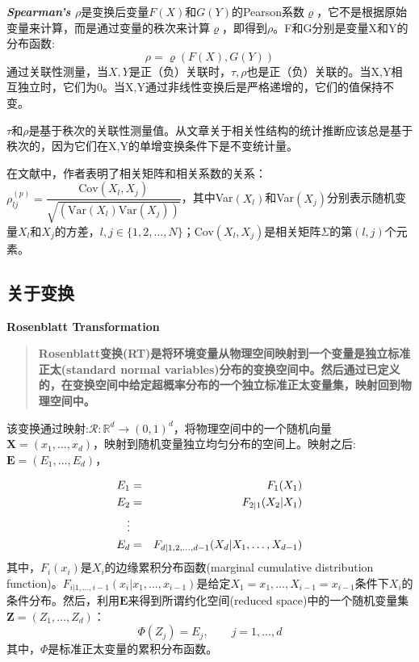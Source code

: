 \emph{\textbf{\textcolor[rgb]{1,0,0}{Spearman's $\rho$}}}是变换后变量$F(X)$和$G(Y)$的Pearson系数$\varrho$\cite{Montes2015}，它不是根据原始变量来计算，而是通过变量的秩次来计算$\varrho$，即得到$\rho$。F和G分别是变量X和Y的分布函数:
\begin{equation}
    \label{eq-rho}
    \rho = \varrho(F(X),G(Y))
\end{equation}
通过关联性测量，当$X,Y$是正（负）关联时，$\tau,\rho$也是正（负）关联的。当X,Y相互独立时，它们为0。当X,Y通过非线性变换后是严格递增的，它们的值保持不变。

\textcolor[rgb]{1,0,0}{$\tau$和$\rho$是基于秩次的关联性测量值。从文章\cite{Genest2007}关于相关性结构的统计推断应该总是基于秩次的，因为它们在X,Y的单增变换条件下是不变统计量。}


在文献\cite{Deligiannis2012}中，作者表明了相关矩阵和相关系数的关系：$\rho_{lj}^{(p)} = \dfrac{\text{Cov}(X_l,X_j)}{\sqrt{\left(\text{Var}(X_l)\text{Var}(X_j)\right)}}$，其中Var$(X_l)$和Var$(X_j)$分别表示随机变量$X_l$和$X_j$的方差，$l,j \in \{1,2,\dots,N\}$；Cov$(X_l,X_j)$是相关矩阵$\Sigma$的第$(l,j)$个元素。



\subsection{关于变换}
\textbf{\textcolor[rgb]{1,0,0}{Rosenblatt Transformation}}
\begin{quotation}
    \textbf{\textcolor[rgb]{1,0,0}{Rosenblatt变换(RT)是将环境变量从物理空间映射到一个变量是独立标准正太(standard normal variables)分布的变换空间中。然后通过已定义的，在变换空间中给定超概率分布的一个独立标准正太变量集，映射回到物理空间中。}}\cite{Montes2015}
\end{quotation}


该变换通过映射:$\mathcal{R}: \mathbb{R}^d \rightarrow (0,1)^d$，将物理空间中的一个随机向量$\mathbf{X}=(x_1,\dots,x_d)$，映射到随机变量独立均匀分布的空间上。映射之后:$\mathbf{E} = (E_1,\dots,E_d)$\cite{Montes2015}，

\begin{eqnarray}
    E_1 &=& F_1(X_1)  \notag \\
    E_2 &=& F_{2|1}(X_2|X_1) \notag \\
    \vdots \\
    E_d &=& F_{d|1,2,\dots,d-1} (X_d | X_1,\dots,X_{d-1}) \notag
    \label{eq-rosenblatt}
\end{eqnarray}
其中，$F_i(x_i)$是$X_i$的\textcolor[rgb]{1,0,0}{边缘累积分布函数(marginal cumulative distribution function)}。$F_{i|1,\dots,i-1}(x_i|x_1,\dots,x_{i-1})$是给定$X_1 = x_1,\dots,X_{i-1}=x_{i-1}$条件下$X_i$的条件分布。然后，利用$\mathbf{E}$来得到所谓\textcolor[rgb]{1,0,0}{约化空间(reduced space)}中的一个随机变量集$\mathbf{Z} = (Z_1,\dots,Z_d)$：
\begin{equation}
    \Phi (Z_j) = E_j, \qquad j=1,\dots,d
    \label{eq-cdf}
\end{equation}
其中，$\Phi$是标准正太变量的累积分布函数。

